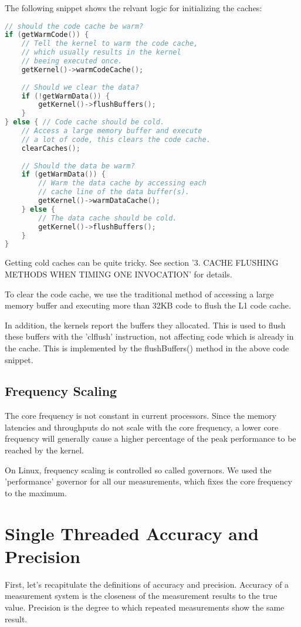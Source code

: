 \documentclass[a4paper,12pt]{article}
\newcommand{\method}[1]{\textsf{#1}}
\begin{document}
The following snippet shows the relvant logic for initializing the caches:

\begin{minipage}{\textwidth-18pt}
\begin{lstlisting}[language=C++]
// should the code cache be warm?
if (getWarmCode()) {
	// Tell the kernel to warm the code cache,  
	// which usually results in the kernel 
	// beeing executed once.
	getKernel()->warmCodeCache(); 
	
	// Should we clear the data?
	if (!getWarmData()) {
		getKernel()->flushBuffers();
	}
} else { // Code cache should be cold.
	// Access a large memory buffer and execute  
	// a lot of code, this clears the code cache.
	clearCaches();
	
	// Should the data be warm?
	if (getWarmData()) {
		// Warm the data cache by accessing each 
		// cache line of the data buffer(s).
		getKernel()->warmDataCache();
	} else {
		// The data cache should be cold. 
		getKernel()->flushBuffers();
	}
} 
\end{lstlisting}
\end{minipage}

Getting cold caches can be quite tricky. See
\cite{Whaley:2008:AAC:1462062.1462065} section '3.
CACHE FLUSHING METHODS WHEN TIMING ONE INVOCATION' for details.

To clear the code cache, we use the traditional method of accessing a large
memory buffer and executing more than 32KB code to flush the L1 code cache.

In addition, the kernels report the buffers they allocated. This is used to
flush these buffers with the 'clflush' instruction, not affecting code which is
already in the cache. This is implemented by the \method{flushBuffers()}
method in the above code snippet.

\subsection{Frequency Scaling}
The core frequency is not constant in current processors. Since the memory
latencies and throughputs do not scale with the core frequency, a lower core
frequency will generally cause a higher percentage of the peak performance to be
reached by the kernel.

On Linux, frequency scaling is controlled so called governors. We used the
'performance' governor for all our measurements, which fixes the core frequency
to the maximum.

\section{Single Threaded Accuracy and Precision}
First, let's recapitulate the definitions of accuracy and precision.
\cite{accuracyAndPrecision} Accuracy of a measurement system is the closeness of
the measurement results to the true value.
Precision is the degree to which repeated measurements show the same result.
\end{document}
